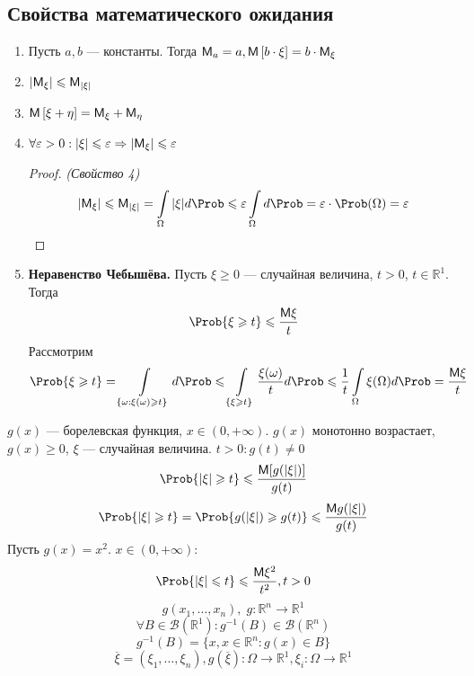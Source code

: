 \subsection{Свойства математического ожидания}
\begin{enumerate}
  \item Пусть $a, b$ --- константы. Тогда $\mathsf{M}_a = a, \mathsf{M} \left[ b \cdot \xi \right] = b \cdot \mathsf{M}_{\xi}$
  \item $|\mathsf{M}_{\xi}| \leqslant \mathsf{M}_{|\xi|}$
  \item $\mathsf{M} \left[ \xi + \eta \right] = \mathsf{M}_{\xi} + \mathsf{M}_{\eta}$
  \item $\forall \varepsilon > 0 : |\xi| \leqslant \varepsilon \Rightarrow |\mathsf{M}_{\xi}| \leqslant \varepsilon$
  \begin{proof} \textit{(Свойство 4)}
    \[
      |\MExpect_{\xi}| \leqslant \MExpect_{|\xi|} = \int\limits_{\Omega} |\xi| d \Prob \leqslant \varepsilon \int\limits_{\Omega} d \Prob = \varepsilon \cdot \Prob(\Omega) = \varepsilon
    \]
  \end{proof}
  \item \textbf{Неравенство Чебышёва.} Пусть $\xi \geqslant 0$ --- случайная величина, $t > 0$, $t \in \mathbb{R}^1$. Тогда
  \[
    \Prob \{ \xi \geqslant t \} \leqslant \frac{\MExpect \xi}{t}
  \]
  Рассмотрим
  \[
    \Prob \{ \xi \geqslant t \} = \int\limits_{\{ \omega: \xi(\omega) \geqslant t\}} d \Prob \leqslant \int\limits_{\{ \xi \geqslant t \}} \frac{\xi(\omega)}{t} d \Prob \leqslant \frac{1}{t} \int\limits_{\Omega} \xi(\Omega) d \Prob = \frac{\MExpect \xi}{t}
  \]
\end{enumerate}
\begin{conclusion}
  $g(x)$ --- борелевская функция, $x \in (0, +\infty)$. $g(x)$ монотонно возрастает, $g(x) \geqslant 0$, $\xi$ --- случайная величина. $t > 0: g(t) \not= 0$
  \[
    \Prob \{ |\xi| \geqslant t \} \leqslant \frac{\MExpect [g(|\xi|)]}{g(t)}
  \]
  \[
    \Prob \{ |\xi| \geqslant t \} = \Prob \{ g(|\xi|) \geqslant g(t) \} \leqslant \frac{\MExpect g(|\xi|)}{g(t)}
  \]
  Пусть $g(x) = x^2$. $x \in (0, +\infty)$:
  \[
    \Prob \{ |\xi| \leqslant t \} \leqslant \frac{\MExpect \xi^2}{t^2}, t > 0
  \]
  \[
    g(x_1, \ldots, x_n), \; g: \mathbb{R}^n \to \mathbb{R}^1
  \]
  \[
    \forall B \in \mathcal{B} (\mathbb{R}^1) : g^{-1}(B) \in \mathcal{B} (\mathbb{R}^n)
  \]
  \[
    g^{-1} (B) = \{ x, x \in \mathbb{R}^n : g(x) \in B \}
  \]
  \[
    \overline{\xi} = (\xi_1, \ldots, \xi_n), g(\overline{\xi}) : \Omega \to \mathbb{R}^1, \xi_i: \Omega \to \mathbb{R}^1
  \]
\end{conclusion}
